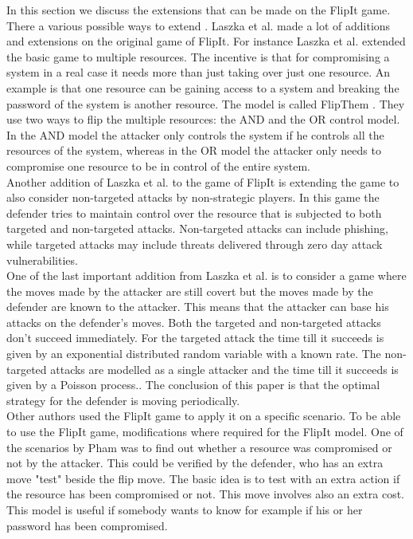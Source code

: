 In this section we discuss the extensions that can be made on the FlipIt game. \\


There a various possible ways to extend . 
Laszka et al. made a lot of additions and extensions on the original game of FlipIt. For instance Laszka et al. extended the basic  game to multiple resources. The incentive is that for compromising a system in a real case it needs more than just taking over just one resource. An example is that one resource can be gaining access to a system and breaking the password of the system is another resource. The model is called FlipThem \cite{FlipThem}. They use two ways to flip the multiple resources: the AND and the OR control model. In the AND model the attacker only controls the system if he controls all the resources of the system, whereas in the OR model the attacker only needs to compromise one resource to be in control of the entire system. \\
Another addition of Laszka et al. to the game of FlipIt \cite{MitigationCovert} is extending the game to also consider non-targeted attacks by non-strategic players. In this game the defender tries to maintain control over the resource that is subjected to both targeted and non-targeted attacks. Non-targeted attacks can include phishing, while targeted attacks may include threats delivered through zero day attack vulnerabilities. \\
One of the last important addition from Laszka et al. \cite{MitigationNonTargeted} is to consider a game where the moves made by the attacker are still covert but the moves made by the defender are known to the attacker. This means that the attacker can base his attacks on the defender's moves. Both the targeted and non-targeted attacks don't succeed immediately. For the targeted attack the time till it succeeds is given by an exponential distributed random variable with a known rate. The non-targeted attacks are modelled as a single attacker and the time till it succeeds is given by a Poisson process.. The conclusion of this paper is that the optimal strategy for the defender is moving periodically. \\ 

Other authors used the FlipIt game to apply it on a specific scenario. To be able to use the FlipIt game, modifications where required for the FlipIt model.
One of the scenarios by Pham \cite{compromised} was to find out whether a resource was compromised or not by the attacker. This could be verified by the defender, who has an extra move "test" beside the flip move. The basic idea is to test with an extra action if the resource has been compromised or not. This move involves also an extra cost. This model is useful if somebody wants to know for example if his or her password has been compromised.   \\

